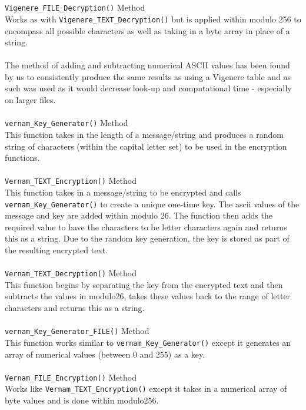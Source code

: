 \documentclass[a4paper, 12pt, titlepage]{report}
\begin{document}
\\\\
\texttt{Vigenere\_FILE\_Decryption()} Method\\
Works as with \texttt{Vigenere\_TEXT\_Decryption()} but is applied within modulo 256 to encompass all possible characters as well as taking in a byte array in place of a string.
\\\\
The method of adding and subtracting numerical ASCII values has been found by us to consistently produce the same results as using a Vigenere table and as such was used as it would decrease look-up and computational time - especially on larger files.
\\\\
\texttt{vernam\_Key\_Generator()} Method\\
This function takes in the length of a message/string and produces a random string of characters (within the capital letter set) to be used in the encryption functions.
\\\\
\texttt{Vernam\_TEXT\_Encryption()} Method\\
This function takes in a message/string to be encrypted and calls \texttt{vernam\_Key\_Generator()} to create a unique one-time key. The ascii values of the message and key are added within modulo 26. The function then adds the required value to have the characters to be letter characters again and returns this as a string. Due to the random key generation, the key is stored as part of the resulting encrypted text.
\\\\
\texttt{Vernam\_TEXT\_Decryption()} Method\\
This function begins by separating the key from the encrypted text and then subtracts the values in modulo26, takes these values back to the range of letter characters and returns this as a string.
\\\\
\texttt{vernam\_Key\_Generator\_FILE()} Method\\
This function works similar to \texttt{vernam\_Key\_Generator()} except it generates an array of numerical values (between 0 and 255) as a key.
\\\\
\texttt{Vernam\_FILE\_Encryption()} Method\\
Works like \texttt{Vernam\_TEXT\_Encryption()} except it takes in a numerical array of byte values and is done within modulo256.
\\\\
\end{document}
